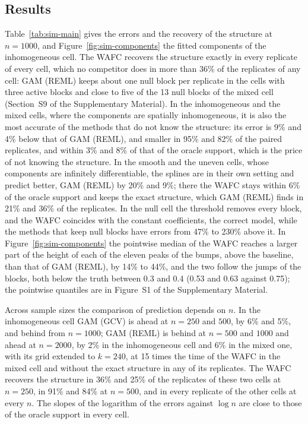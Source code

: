 \subsection{Results}
\label{sec:sim-results}

Table~\ref{tab:sim-main} gives the errors and the recovery of the structure at
$n = 1000$, and Figure~\ref{fig:sim-components} the fitted components of the
inhomogeneous cell. The WAFC recovers the structure exactly in every replicate
of every cell, which no competitor does in more than 36\% of the replicates of
any cell: GAM (REML) keeps about one null block per replicate in the cells with
three active blocks and close to five of the 13 null blocks of the mixed cell
(Section~S9 of the Supplementary Material). In the inhomogeneous and the mixed
cells, where the components are spatially inhomogeneous, it is also the most
accurate of the methods that do not know the structure: its error is 9\% and
4\% below that of GAM (REML), and smaller in 95\% and 82\% of the paired
replicates, and within 3\% and 8\% of that of the oracle support, which is the
price of not knowing the structure. In the smooth and the uneven cells, whose
components are infinitely differentiable, the splines are in their own
setting and predict better, GAM (REML) by 20\% and 9\%; there the WAFC stays
within 6\% of the oracle support and keeps the exact structure, which GAM
(REML) finds in 21\% and 36\% of the replicates. In the null cell the
threshold removes every block, and the WAFC coincides with the constant
coefficients, the correct model, while the methods that keep null blocks have
errors from 47\% to 230\% above it. In Figure~\ref{fig:sim-components} the
pointwise median of the WAFC reaches a larger part of the height of each of
the eleven peaks of the bumps, above the baseline, than that of GAM (REML), by
14\% to 44\%, and the two follow the jumps of the blocks, both below the
truth between 0.3 and 0.4 (0.53 and 0.63 against 0.75); the pointwise
quantiles are in Figure~S1 of the Supplementary Material.

Across sample sizes the comparison of prediction depends on $n$. In the
inhomogeneous cell GAM (GCV) is ahead at $n = 250$ and $500$, by 6\% and 5\%,
and behind from $n = 1000$; GAM (REML) is behind at $n = 500$ and $1000$ and
ahead at $n = 2000$, by 2\% in the inhomogeneous cell and 6\% in the mixed
one, with its grid extended to $k = 240$, at 15 times the time of the WAFC in
the mixed cell and without the exact structure in any of its replicates. The
WAFC recovers the structure in 36\% and 25\% of the replicates of these two
cells at $n = 250$, in 91\% and 84\% at $n = 500$, and in every replicate of
the other cells at every $n$. The slopes of the logarithm of the errors
against $\log n$ are close to those of the oracle support in every cell.

